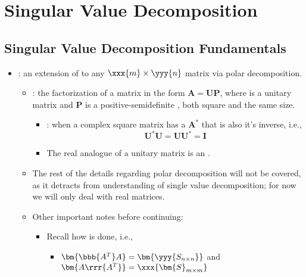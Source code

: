 \chapter{Singular Value Decomposition}\label{Singular Value Decomposition}

\section{Singular Value Decomposition Fundamentals}\label{Singular Value Decomposition Fundamentals}
\begin{itemize}
  \item {}: an extension of \hyperref[Eigendecomposition]{} to any \(\xxx{m} \times \yyy{n} \) matrix via polar decomposition.
    \begin{itemize}
      \item {}: the factorization of a matrix  in the form \(\bm{A}=\bm{U}{\bm
      {P}}\), where  is a unitary matrix and \(\bm{{P}}\) is a positive-semidefinite \hyperref[Diagonal and Trace]{}, both square and the same size.
        \begin{itemize}
          \item {}: when a complex square matrix has a \hyperref[Conjugate Transpose]{} \(\bm{A}^* \) that is also it's inverse, i.e.,
          \[%
          \bm{U}^*\bm{U} = \bm{U}\bm{U}^* = \bm{I}
          \]%
          \item The real analogue of a unitary matrix is an \hyperref[Orthogonal Matrices]{}.
        \end{itemize}
      \item The rest of the details regarding polar decomposition will not be covered, as it detracts from understanding of single value decomposition; for now we will only deal with real matrices.
      \item Other important notes before continuing:
      \begin{itemize}
        \item Recall how \hyperref[Hadamard Multiplication]{} is done, i.e.,
        \begin{itemize}
          \item \(\bm{\bbb{A^T}A}=\bm{\yyy{S_{n\times n}}}\) \quad and \quad \(\bm{A\rrr{A^T}} = \xxx{\bm{S}_{m \times m}}\)

\end{itemize}
\end{itemize}
\end{itemize}
\end{itemize}
